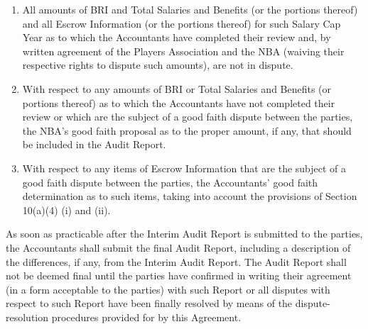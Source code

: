 \documentclass[
]{book}
\providecommand{\tightlist}{%
  \setlength{\itemsep}{0pt}\setlength{\parskip}{0pt}}
\begin{document}
\begin{enumerate}
\begin{enumerate}
    \begin{enumerate}
    \def\labelenumiii{(\roman{enumiii})}
    \tightlist
    \item
      All amounts of BRI and Total Salaries and Benefits (or the portions thereof) and all Escrow Information (or the portions thereof) for such Salary Cap Year as to which the Accountants have completed their review and, by written agreement of the Players Association and the NBA (waiving their respective rights to dispute such amounts), are not in dispute.
    \item
      With respect to any amounts of BRI or Total Salaries and Benefits (or portions thereof) as to which the Accountants have not completed their review or which are the subject of a good faith dispute between the parties, the NBA's good faith proposal as to the proper amount, if any, that should be included in the Audit Report.
    \item
      With respect to any items of Escrow Information that are the subject of a good faith dispute between the parties, the Accountants' good faith determination as to such items, taking into account the provisions of Section 10(a)(4) (i) and (ii).
    \end{enumerate}

    As soon as practicable after the Interim Audit Report is submitted to the parties, the Accountants shall submit the final Audit Report, including a description of the differences, if any, from the Interim Audit Report. The Audit Report shall not be deemed final until the parties have confirmed in writing their agreement (in a form acceptable to the parties) with such Report or all disputes with respect to such Report have been finally resolved by means of the dispute-resolution procedures provided for by this Agreement.


\end{enumerate}
\end{enumerate}
\end{document}
